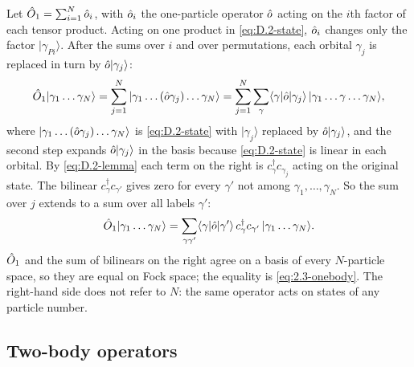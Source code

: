 Let $\hat{O}_1 = \sum_{i=1}^N\hat{o}_i$, with $\hat{o}_i$ the one-particle operator $\hat{o}$ acting on the $i$th factor of each tensor product. Acting on one product in \cref{eq:D.2-state}, $\hat{o}_i$ changes only the factor $|\gamma_{Pi}\rangle$. After the sums over $i$ and over permutations, each orbital $\gamma_j$ is replaced in turn by $\hat{o}|\gamma_j\rangle$:
\begin{equation*}
  \hat{O}_1|\gamma_1\dots\gamma_N\rangle = \sum_{j=1}^N|\gamma_1\dots(\hat{o}\gamma_j)\dots\gamma_N\rangle
  = \sum_{j=1}^N\sum_\gamma\langle\gamma|\hat{o}|\gamma_j\rangle\,|\gamma_1\dots\gamma\dots\gamma_N\rangle ,
\end{equation*}
where $|\gamma_1\dots(\hat{o}\gamma_j)\dots\gamma_N\rangle$ is \cref{eq:D.2-state} with $|\gamma_j\rangle$ replaced by $\hat{o}|\gamma_j\rangle$, and the second step expands $\hat{o}|\gamma_j\rangle$ in the basis because \cref{eq:D.2-state} is linear in each orbital. By \cref{eq:D.2-lemma} each term on the right is $c^\dagger_\gamma c_{\gamma_j}$ acting on the original state. The bilinear $c^\dagger_\gamma c_{\gamma'}$ gives zero for every $\gamma'$ not among $\gamma_1,\dots,\gamma_N$. So the sum over $j$ extends to a sum over all labels $\gamma'$:
\begin{equation*}
  \hat{O}_1|\gamma_1\dots\gamma_N\rangle = \sum_{\gamma\gamma'}\langle\gamma|\hat{o}|\gamma'\rangle\,c^\dagger_\gamma c_{\gamma'}\,|\gamma_1\dots\gamma_N\rangle .
\end{equation*}
$\hat{O}_1$ and the sum of bilinears on the right agree on a basis of every $N$-particle space, so they are equal on Fock space; the equality is \cref{eq:2.3-onebody}. The right-hand side does not refer to $N$: the same operator acts on states of any particle number.

\subsection*{Two-body operators}

